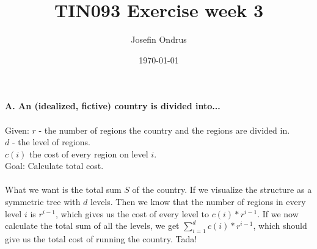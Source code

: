 \documentclass[12pt,oneside,reqno]{amsart}
\begin{document}
\setlength{\parindent}{6pt}
\def\code#1{\texttt{#1}} %

\title{TIN093 Exercise week 3}
\author{Josefin Ondrus}
\date{\today}
\maketitle

\textbf{A. An (idealized, fictive) country is divided into...}\\\\
Given: $r$ - the number of regions the country and the regions are divided in.\\
$d$ - the level of regions.\\
$c(i)$ the cost of every region on level $i$.\\
Goal: Calculate total cost.\\\\
What we want is the total sum $S$ of the country. If we visualize the structure as a symmetric tree with $d$ levels. Then we know that the number of regions in every level $i$ is $r^{i-1}$, which gives us the cost of every level to $c(i)*r^{i-1}$. If we now calculate the total sum of all the levels, we get $\sum_{i=1}^{d}c(i)*r^{i-1}$, which should give us the total cost of running the country. Tada!\\\\
\end{document}
